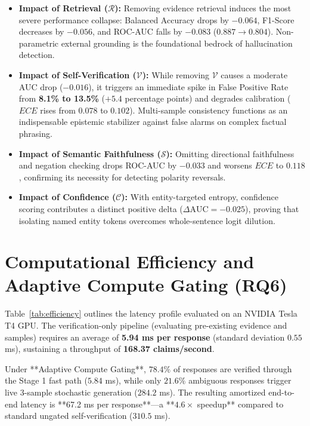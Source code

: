 \documentclass[conference]{IEEEtran}
\begin{document}
\begin{itemize}
    \item \textbf{Impact of Retrieval ($\mathcal{R}$):} Removing evidence retrieval induces the most severe performance collapse: Balanced Accuracy drops by $-0.064$, F1-Score decreases by $-0.056$, and ROC-AUC falls by \textbf{$-0.083$} ($0.887 \to 0.804$). Non-parametric external grounding is the foundational bedrock of hallucination detection.
    \item \textbf{Impact of Self-Verification ($\mathcal{V}$):} While removing $\mathcal{V}$ causes a moderate AUC drop ($-0.016$), it triggers an immediate spike in False Positive Rate from \textbf{8.1\% to 13.5\%} ($+5.4$ percentage points) and degrades calibration ($ECE$ rises from $0.078$ to $0.102$). Multi-sample consistency functions as an indispensable epistemic stabilizer against false alarms on complex factual phrasing.
    \item \textbf{Impact of Semantic Faithfulness ($\mathcal{S}$):} Omitting directional faithfulness and negation checking drops ROC-AUC by $-0.033$ and worsens $ECE$ to $0.118$, confirming its necessity for detecting polarity reversals.
    \item \textbf{Impact of Confidence ($\mathcal{C}$):} With entity-targeted entropy, confidence scoring contributes a distinct positive delta ($\Delta \text{AUC} = -0.025$), proving that isolating named entity tokens overcomes whole-sentence logit dilution.
\end{itemize}

\section{Computational Efficiency and Adaptive Compute Gating (RQ6)}
Table~\ref{tab:efficiency} outlines the latency profile evaluated on an NVIDIA Tesla T4 GPU. The verification-only pipeline (evaluating pre-existing evidence and samples) requires an average of \textbf{5.94 ms per response} (standard deviation $0.55$ ms), sustaining a throughput of \textbf{168.37 claims/second}.

Under **Adaptive Compute Gating**, $78.4\%$ of responses are verified through the Stage 1 fast path ($5.84$ ms), while only $21.6\%$ ambiguous responses trigger live 3-sample stochastic generation ($284.2$ ms). The resulting amortized end-to-end latency is **67.2 ms per response**---a **$4.6\times$ speedup** compared to standard ungated self-verification ($310.5$ ms).
\end{document}

